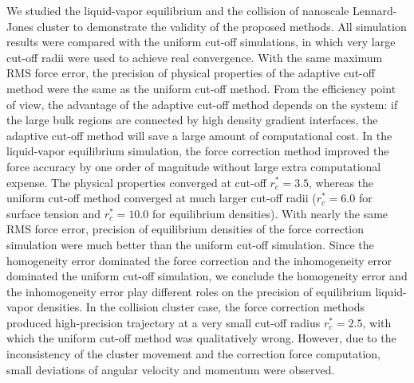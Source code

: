 \documentclass[aps,pre,preprint]{revtex4-1}
\begin{document}
We studied the liquid-vapor equilibrium and the collision of nanoscale
Lennard-Jones cluster to demonstrate the validity of the proposed
methods.  All simulation results were compared with the uniform
cut-off simulations, in which very large cut-off radii were used to
achieve real convergence.  With the same maximum RMS force error,
the precision of physical properties of the adaptive cut-off method
were the same as the uniform cut-off method. From the efficiency
point of view, the advantage of the adaptive cut-off method depends on the
system: if the large bulk regions are connected by high density
gradient interfaces, the adaptive cut-off method will save a large amount of
computational cost.  In the liquid-vapor equilibrium simulation, the
force correction method improved the force accuracy by one order of
magnitude without large extra computational expense. The physical
properties converged at cut-off $r_c^\ast = 3.5$, whereas the uniform
cut-off method converged at much larger cut-off radii ($r_c^\ast = 6.0$
for surface tension and $r_c^\ast = 10.0$ for equilibrium
densities). With nearly the same RMS force error, precision of
equilibrium densities of the force correction simulation were much
better than the uniform cut-off simulation.  Since the homogeneity
error dominated the force correction and the inhomogeneity error
dominated the uniform cut-off simulation, we conclude the homogeneity
error and the inhomogeneity error play different roles on the precision
of equilibrium liquid-vapor densities.  In the collision cluster case,
the force correction methods produced high-precision trajectory at a
very small cut-off radius $r_c^\ast=2.5$, with which the uniform
cut-off method was qualitatively wrong. However, due to the
inconsistency of the cluster movement and the correction force
computation, small deviations of angular velocity and momentum were
observed.





{}

\end{document}
